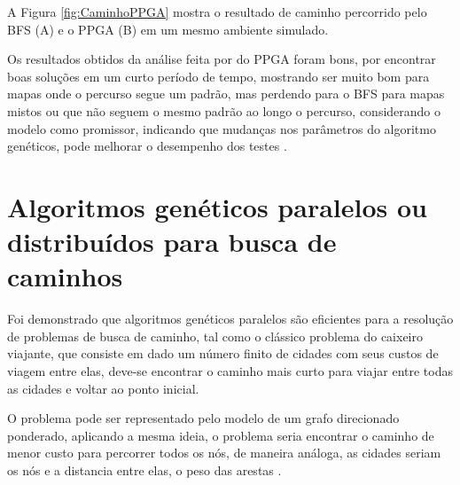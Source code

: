 A Figura \ref{fig:CaminhoPPGA} mostra o resultado de caminho percorrido pelo BFS (A) e o PPGA (B) em um mesmo ambiente simulado. 


\begin{minipage}{\linewidth}
	\label{fig:CaminhoPPGA}
\end{minipage}

Os resultados obtidos da análise feita por \cite{Ulysses} do PPGA foram bons, por encontrar boas soluções em um curto período de tempo, mostrando ser muito bom para mapas onde o percurso segue um padrão, mas perdendo para o BFS para mapas mistos ou que não seguem o mesmo padrão ao longo o percurso, considerando o modelo como promissor, indicando que mudanças nos parâmetros do algoritmo genéticos, pode melhorar o desempenho dos testes \cite{Ulysses}. 

\section{Algoritmos genéticos paralelos ou distribuídos para busca de caminhos}

Foi demonstrado que algoritmos genéticos paralelos são eficientes para a resolução de problemas de busca de caminho, tal como o clássico problema do caixeiro viajante, que consiste em dado um número finito de cidades com seus custos de viagem entre elas, deve-se encontrar o caminho mais curto para viajar entre todas as cidades e voltar ao ponto inicial. 

O problema pode ser representado pelo modelo de um grafo direcionado ponderado, aplicando a mesma ideia, o problema seria encontrar o caminho de menor custo para percorrer todos os nós, de maneira análoga, as cidades seriam os nós e a distancia entre elas, o peso das arestas \cite{Jason}\cite{Alaoui}\cite{Heinz}.

